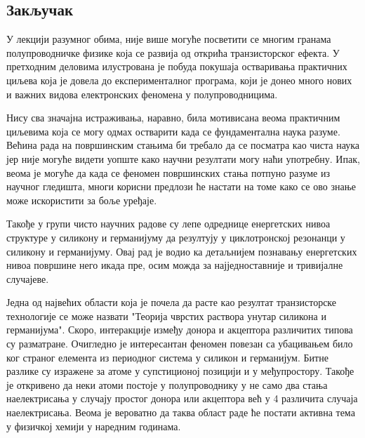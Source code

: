 \documentclass{article}
\begin{document}
\subsection{Закључак}

У лекцији разумног обима, није више могуће посветити се многим гранама полупроводничке физике која се развија од открића транзисторског ефекта. У претходним деловима илустрована је побуда покушаја остваривања практичних циљева која је довела до експерименталног програма, који је донео много нових и важних видова електронских феномена у полупроводницима.

Нису сва значајна истраживања, наравно, била мотивисана веома практичним циљевима која се могу одмах остварити када се фундаментална наука разуме. Већина рада на површинским стањима би требало да се посматра као чиста наука јер није могуће видети уопште како научни резултати могу наћи употребну. Ипак, веома је могуће да када се феномен површинских стања потпуно разуме из научног гледишта, многи корисни предлози ће настати на томе како се ово знање може искористити за боље уређаје.

Такође у групи чисто научних радове су лепе одреднице енергетских нивоа структуре у силикону и германијуму да резултују у циклотронској резонанци у силикону и германијуму. Овај рад је водио ка детаљнијем познавању енергетских нивоа површине него икада пре, осим можда за најједноставније и тривијалне случајеве.

Једна од највећих области која је почела да расте као резултат транзисторске технологије се може назвати "Теорија чврстих раствора унутар силикона и германијума". Скоро, интеракције између донора и акцептора различитих типова су разматране. Очигледно је интересантан феномен повезан са убацивањем било ког страног елемента из периодног система у силикон и германијум. Битне разлике су изражене за атоме у супстиционој позицији и у међупростору. Такође је откривено да неки атоми постоје у полупроводнику у не само два стања наелектрисања у случају простог донора или акцептора већ у 4 различита случаја наелектрисања. Веома је вероватно да таква област раде ће постати активна тема у физичкој хемији у наредним годинама.
\end{document}
